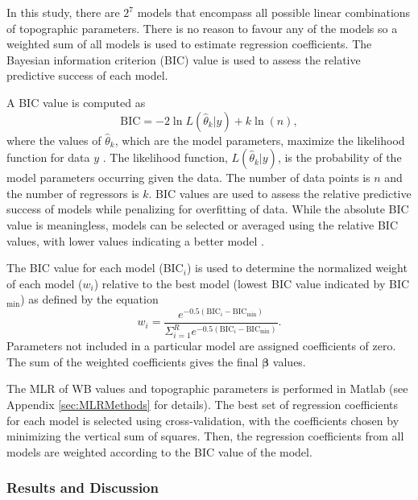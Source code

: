 \documentclass{sfuthesis}
\begin{document}
In this study, there are $2^7$ models that encompass all possible linear combinations of topographic parameters. There is no reason to favour any of the models so a weighted sum of all models is used to estimate regression coefficients.   The Bayesian information criterion (BIC) value is used to assess the relative predictive success of each model. 

A BIC value is computed as
\begin{equation}
\textrm{BIC} = -2 \ln L(\hat\theta_k  | y) + k \ln(n),
\end{equation}
where the values of $\hat \theta_k$, which are the model parameters, maximize the likelihood function for data $y$ \citep{Burnham2004}. The likelihood function, $ L(\hat\theta_k  | y)$, is the probability of the model parameters occurring given the data. The number of data points is $n$ and the number of regressors is $k$. BIC values are used to assess the relative predictive success of models while penalizing for overfitting of data. While the absolute BIC value is meaningless, models can be selected or averaged using the relative BIC values, with lower values indicating a better model \citep{Burnham2004}. 

The BIC value for each model (BIC$_i$) is used to determine the normalized weight of each model ($w_i$) relative to the best model (lowest BIC value indicated by BIC$_{\min}$) as defined by the equation \citep{Burnham2004}
\begin{equation}
w_i = \frac{e^{-0.5(\mathrm{BIC}_i-\mathrm{BIC}_{\min})}}{\Sigma_{i=1}^R e^{-0.5(\mathrm{BIC}_i-\mathrm{BIC}_{\min})}}.
\label{eq:BIC}
\end{equation}
Parameters not included in a particular model are assigned coefficients of zero. The sum of the weighted coefficients gives the final $\bm{\beta}$ values.

The MLR of WB values and topographic parameters is performed in Matlab (see Appendix \ref{sec:MLRMethods} for details). The best set of regression coefficients for each model is selected using cross-validation, with the coefficients chosen by minimizing the vertical sum of squares. Then, the regression coefficients from all models are weighted according to the BIC value of the model.

\subsubsection{Results and Discussion}
\end{document}
